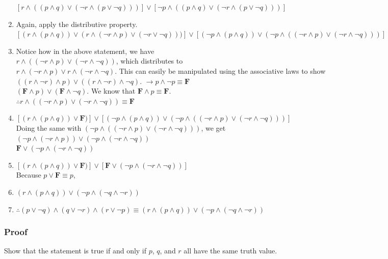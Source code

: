 \documentclass[12pt]{article}
\begin{document}
\begin{enumerate}
    $[r \land ((p \land q) \lor (\neg r \land (p \lor \neg q)))] \lor 
    [\neg p \land ((p \land q) \lor (\neg r \land (p \lor \neg q)))]$
  \item Again, apply the distributive property. \\
    $[(r \land (p \land q)) \lor (r \land (\neg r \land p) \lor (\neg r \lor \neg q)))]
    \lor [(\neg p \land (p \land q)) \lor (\neg p \land ((\neg r \land p) \lor (\neg r \land \neg q)))]$
  \item Notice how in the above statement, we have \\
    $r \land ((\neg r \land p) \lor (\neg r \land \neg q))$, which distributes to \\
    $r \land (\neg r \land p) \lor r \land (\neg r \land \neg q)$.
    This can easily be manipulated using the associative laws to show \\
    $((r \land \neg r) \land p) \lor ((r \land \neg r) \land \neg q)$. $\to p \land \neg p \equiv \mathbf{F}$\\
    $(\mathbf{F} \land p) \lor (\mathbf{F} \land \neg q)$. We know that $\mathbf{F} \land p \equiv \mathbf{F}$.\\
    $\therefore r \land ((\neg r \land p) \lor (\neg r \land \neg q)) \equiv \mathbf{F}$
  \item $[(r \land (p \land q)) \lor \mathbf{F})]
    \lor [(\neg p \land (p \land q)) \lor (\neg p \land ((\neg r \land p) \lor (\neg r \land \neg q)))]$\\
    Doing the same with $(\neg p \land ((\neg r \land p) \lor (\neg r \land \neg q)))$, we get \\
    $(\neg p \land (\neg r \land p)) \lor (\neg p \land (\neg r \land \neg q))$\\
    $\mathbf{F} \lor (\neg p \land (\neg r \land \neg q))$
  \item $[(r \land (p \land q)) \lor \mathbf{F})] \lor 
    [\mathbf{F} \lor (\neg p \land (\neg r \land \neg q))]$\\
    Because $p \lor \mathbf{F} \equiv p$,
  \item $(r \land (p \land q)) \lor (\neg p \land (\neg q \land \neg r))$
  \item $\therefore (p \lor \neg q) \land (q \lor \neg r) \land (r \lor \neg p) \equiv
    (r \land (p \land q)) \lor (\neg p \land (\neg q \land \neg r))$
\end{enumerate}

\subsubsection*{Proof}
Show that the statement is true if and only if $p$, $q$, and $r$ all have the 
same truth value.
\end{document}
